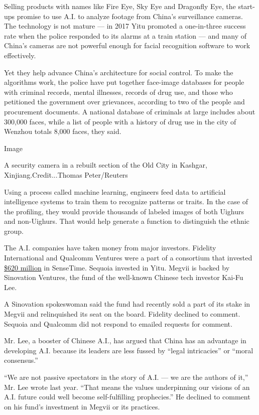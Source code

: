 Selling products with names like Fire Eye, Sky Eye and Dragonfly Eye,
the start-ups promise to use A.I. to analyze footage from China's
surveillance cameras. The technology is not mature --- in 2017 Yitu
promoted a one-in-three success rate when the police responded to its
alarms at a train station --- and many of China's cameras are not
powerful enough for facial recognition software to work effectively.

Yet they help advance China's architecture for social control. To make
the algorithms work, the police have put together face-image databases
for people with criminal records, mental illnesses, records of drug use,
and those who petitioned the government over grievances, according to
two of the people and procurement documents. A national database of
criminals at large includes about 300,000 faces, while a list of people
with a history of drug use in the city of Wenzhou totals 8,000 faces,
they said.

Image

A security camera in a rebuilt section of the Old City in Kashgar,
Xinjiang.Credit...Thomas Peter/Reuters

Using a process called machine learning, engineers feed data to
artificial intelligence systems to train them to recognize patterns or
traits. In the case of the profiling, they would provide thousands of
labeled images of both Uighurs and non-Uighurs. That would help generate
a function to distinguish the ethnic group.

The A.I. companies have taken money from major investors. Fidelity
International and Qualcomm Ventures were a part of a consortium that
invested \href{https://www.sensetime.com/news/682.html}{\$620 million}
in SenseTime. Sequoia invested in Yitu. Megvii is backed by Sinovation
Ventures, the fund of the well-known Chinese tech investor Kai-Fu Lee.

A Sinovation spokeswoman said the fund had recently sold a part of its
stake in Megvii and relinquished its seat on the board. Fidelity
declined to comment. Sequoia and Qualcomm did not respond to emailed
requests for comment.

Mr. Lee, a booster of Chinese A.I., has argued that China has an
advantage in developing A.I. because its leaders are less fussed by
``legal intricacies'' or ``moral consensus.''

``We are not passive spectators in the story of A.I. --- we are the
authors of it,'' Mr. Lee wrote last year. ``That means the values
underpinning our visions of an A.I. future could well become
self-fulfilling prophecies.'' He declined to comment on his fund's
investment in Megvii or its practices.

